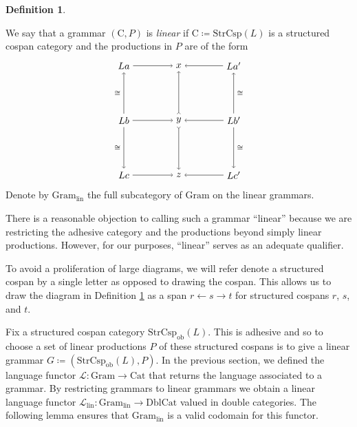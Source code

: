 \documentclass{amsart}
\newcommand{\ob}{_{ \text{ob} }}
\newcommand{\lin}{_{\t{lin}}}
\newcommand{\iso}{\cong}
\newcommand{\C}{\cat{C}}
\newcommand{\Cat}{\cat{Cat}}
\newcommand{\DblCat}{\cat{DblCat}}
\newcommand{\Gram}{\cat{Gram}}
\newcommand{\StrCsp}{\cat{StrCsp}}
\newcommand{\Lang}{\mathcal{L}}
\newcommand{\cat}[1]{\mathrm{#1}}
\renewcommand{\t}[1]{\text{#1}}
\newcommand{\from}{\colon}
\theoremstyle{remark}
\theoremstyle{definition}
\newtheorem{definition}[theorem]{Definition}
\begin{document}
\begin{definition} \label{def:linear-grammar}

  We say that a grammar $ ( \C , P ) $ is \emph{linear} if
  $ \C \coloneqq \StrCsp ( L ) $ is a structured cospan category and
  the productions in $ P $ are of the form
    \[
      \begin{tikzpicture}
        \begin{scope}
        \node (1) at (0,4) {\( La  \)};
        \node (2) at (2,4) {\( x \)};
        \node (3) at (4,4) {\( La' \)};
        \node (4) at (0,2) {\( Lb \)};
        \node (5) at (2,2) {\( y \)};
        \node (6) at (4,2) {\( Lb' \)};
        \node (7) at (0,0) {\( Lc \)};
        \node (8) at (2,0) {\( z \)};
        \node (9) at (4,0) {\( Lc' \)};
        \draw [->] (1) to node [] {\scriptsize{\(  \)}} (2);
        \draw [->] (3) to node [] {\scriptsize{\(  \)}} (2);
        \draw [->] (4) to node [] {\scriptsize{\(  \)}} (5);
        \draw [->] (6) to node [] {\scriptsize{\(  \)}} (5);
        \draw [->] (7) to node [] {\scriptsize{\(  \)}} (8);
        \draw [->] (9) to node [] {\scriptsize{\(  \)}} (8);
        \draw [->] (4) to node [left] {\scriptsize{\( \iso \)}} (1);
        \draw [->] (4) to node [left] {\scriptsize{\( \iso \)}} (7);
        \draw [>->] (5) to node [] {\scriptsize{\(  \)}} (2);
        \draw [>->] (5) to node [] {\scriptsize{\(  \)}} (8);
        \draw [->] (6) to node [right] {\scriptsize{\( \iso \)}} (3);
        \draw [->] (6) to node [right] {\scriptsize{\( \iso \)}} (9);
        \end{scope}
      \end{tikzpicture}
    \]
    Denote by $ \Gram\lin $ the full subcategory of $ \Gram $ on the
    linear grammars.
  
\end{definition}

There is a reasonable objection to calling such a grammar ``linear''
because we are restricting the adhesive category and the productions
beyond simply linear productions. However, for our purposes,
``linear'' serves as an adequate qualifier.

To avoid a proliferation of large diagrams, we will refer denote a
structured cospan by a single letter as opposed to drawing the
cospan.  This allows us to draw the diagram in Definition
\ref{def:linear-grammar} as a span $ r \gets s \to t $ for structured
cospans $ r $, $ s $, and $ t $. 

Fix a structured cospan category $ \StrCsp\ob (L) $. This is adhesive
and so to choose a set of linear productions $ P $ of these structured
cospans is to give a linear grammar
%
\(
  G \coloneqq ( \StrCsp\ob (L) , P ).
\)
% 
In the previous section, we defined the language functor
%
\(
  \Lang \from \Gram \to \Cat 
\)
% 
that returns the language associated to a grammar. By restricting
grammars to linear grammars we obtain a linear language functor
$ \Lang\lin \from \Gram\lin \to \DblCat $ valued in double categories.
The following lemma ensures that $ \Gram\lin $ is a valid codomain for
this functor.
%
%
\end{document}
